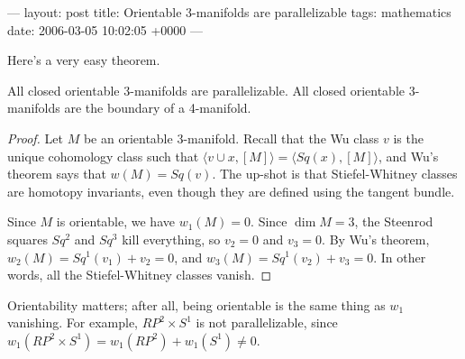 ---
layout: post
title: Orientable 3-manifolds are parallelizable
tags: mathematics
date: 2006-03-05 10:02:05 +0000
---

Here's a very easy theorem.

\begin{theorem}
All closed orientable 3-manifolds are parallelizable.  All closed orientable 3-manifolds are the boundary of a 4-manifold.
\end{theorem}

\begin{proof}
Let $M$ be an orientable $3$-manifold.  Recall that the Wu class $v$ is the unique cohomology class such that $\langle v \cup x, [M] \rangle = \langle Sq(x), [M] \rangle$, and Wu's theorem says that $w(M) = Sq(v)$.  The up-shot is that Stiefel-Whitney classes are homotopy invariants, even though they are defined using the tangent bundle.

Since $M$ is orientable, we have $w_1(M) = 0$.   Since $\dim M = 3$, the Steenrod squares $Sq^2$ and $Sq^3$ kill everything, so $v_2 = 0$ and $v_3 = 0$.  By Wu's theorem, $w_2(M) = Sq^1(v_1) + v_2 = 0$, and $w_3(M) = Sq^1(v_2) + v_3 = 0$.  In other words, all the Stiefel-Whitney classes vanish.
\end{proof}

Orientability matters; after all, being orientable is the same thing as $w_1$ vanishing.  For example, $RP^2 \times S^1$ is not parallelizable, since $w_1(RP^2 \times S^1) = w_1(RP^2) + w_1(S^1) \neq 0$.

